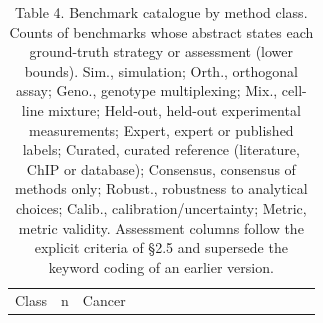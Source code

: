 \documentclass[11pt]{article}
\begin{document}
\begin{scriptsize}

\begin{longtable}[]{@{}
  >{\raggedright\arraybackslash}p{}
  >{\raggedright\arraybackslash}p{}
  >{\raggedright\arraybackslash}p{}
  >{\raggedright\arraybackslash}p{}
  >{\raggedright\arraybackslash}p{}
  >{\raggedright\arraybackslash}p{}
  >{\raggedright\arraybackslash}p{}
  >{\raggedright\arraybackslash}p{}
  >{\raggedright\arraybackslash}p{}
  >{\raggedright\arraybackslash}p{}
  >{\raggedright\arraybackslash}p{}
  >{\raggedright\arraybackslash}p{}
  >{\raggedright\arraybackslash}p{}
  >{\raggedright\arraybackslash}p{}
  >{\raggedright\arraybackslash}p{}
  >{\raggedright\arraybackslash}p{}@{}}
\caption{Table 4. Benchmark catalogue by method class. Counts of
benchmarks whose abstract states each ground-truth strategy or
assessment (lower bounds). Sim., simulation; Orth., orthogonal assay;
Geno., genotype multiplexing; Mix., cell-line mixture; Held-out,
held-out experimental measurements; Expert, expert or published labels;
Curated, curated reference (literature, ChIP or database); Consensus,
consensus of methods only; Robust., robustness to analytical choices;
Calib., calibration/uncertainty; Metric, metric validity. Assessment
columns follow the explicit criteria of §2.5 and supersede the keyword
coding of an earlier version.}\tabularnewline
\toprule\noalign{}
\begin{minipage}[b]{\linewidth}\raggedright
Class
\end{minipage} & \begin{minipage}[b]{\linewidth}\raggedright
n
\end{minipage} & \begin{minipage}[b]{\linewidth}\raggedright
Cancer
\end{minipage} & \begin{minipage}[b]{\linewidth}\raggedright

\end{minipage}
\end{longtable}
\end{scriptsize}
\end{document}
